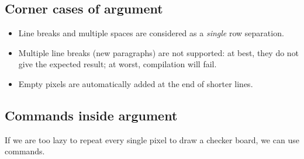 \documentclass[
  load-preamble-,
  babel-options=english,
  add-index=true,
]{cnltx-doc}
\begin{document}
\subsection{Corner cases of  argument}
\label{sec:corner}

\begin{itemize}
  \item Line breaks and multiple spaces are considered as a \emph{single} row separation.
\begin{sidebyside}
\end{sidebyside}
\item Multiple line breaks (new paragraphs) are not supported: at best, they do not give the expected result; at worst, compilation will fail.
\begin{sidebyside}
\end{sidebyside}
\item Empty pixels are automatically added at the end of shorter lines.
  \begin{sidebyside}
  \end{sidebyside}
\end{itemize}

\subsection{Commands inside  argument}
\label{sec:commands}

If we are too lazy to repeat every single pixel to draw a checker board, we can use commands.
\end{document}

